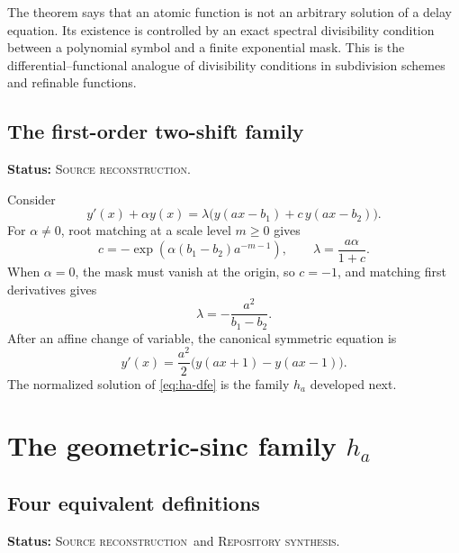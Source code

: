 \documentclass[11pt]{article}
\theoremstyle{definition}
\theoremstyle{remark}
\newcommand{\SourceStatus}{\textcolor{SourceBlue}{\textsc{Source reconstruction}}}
\newcommand{\RepoStatus}{\textcolor{RepoOlive}{\textsc{Repository synthesis}}}
\newcommand{\status}[1]{\par\smallskip\noindent\textbf{Status:} #1.\par\smallskip}
\begin{document}
The theorem says that an atomic function is not an arbitrary solution of a delay equation.  Its existence is controlled by an exact spectral divisibility condition between a polynomial symbol and a finite exponential mask.  This is the differential--functional analogue of divisibility conditions in subdivision schemes and refinable functions.

\subsection{The first-order two-shift family}
\status{\SourceStatus}

Consider
\begin{equation}
  y'(x)+\alpha y(x)=\lambda\bigl(y(ax-b_1)+c\,y(ax-b_2)\bigr).
  \label{eq:first-order-family}
\end{equation}
For \(\alpha\ne0\), root matching at a scale level \(m\ge0\) gives
\begin{equation}
  c=-\exp\!\left(\alpha(b_1-b_2)a^{-m-1}\right),
  \qquad
  \lambda=\frac{a\alpha}{1+c}.
  \label{eq:first-order-params}
\end{equation}
When \(\alpha=0\), the mask must vanish at the origin, so \(c=-1\), and matching first derivatives gives
\begin{equation}
  \lambda=-\frac{a^2}{b_1-b_2}.
  \label{eq:first-order-alpha-zero}
\end{equation}
After an affine change of variable, the canonical symmetric equation is
\begin{equation}
  y'(x)=\frac{a^2}{2}\bigl(y(ax+1)-y(ax-1)\bigr).
  \label{eq:ha-dfe}
\end{equation}
The normalized solution of \eqref{eq:ha-dfe} is the family \(h_a\) developed next.

\section{The geometric-sinc family \texorpdfstring{\(h_a\)}{h-a}}
\label{sec:ha}

\subsection{Four equivalent definitions}
\status{\SourceStatus\ and \RepoStatus}
\end{document}
